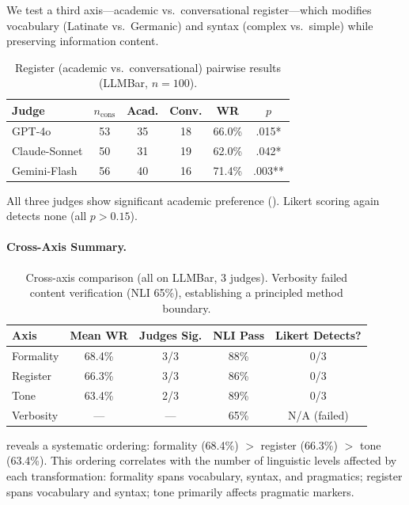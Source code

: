 \documentclass[11pt,a4paper]{article}
\begin{document}
We test a third axis---academic vs.\ conversational register---which modifies vocabulary (Latinate vs.\ Germanic) and syntax (complex vs.\ simple) while preserving information content.

\begin{table}[t]
\centering
\small
\caption{Register (academic vs.\ conversational) pairwise results (LLMBar, $n=100$).}
\label{tab:register}
\begin{tabular}{lccccc}
\toprule
\textbf{Judge} & $n_\text{cons}$ & \textbf{Acad.} & \textbf{Conv.} & \textbf{WR} & $p$ \\
\midrule
GPT-4o        & 53 & 35 & 18 & 66.0\% & .015*  \\
Claude-Sonnet & 50 & 31 & 19 & 62.0\% & .042*  \\
Gemini-Flash  & 56 & 40 & 16 & 71.4\% & .003** \\
\bottomrule
\end{tabular}
\end{table}

All three judges show significant academic preference ().
Likert scoring again detects none (all $p > 0.15$).

\paragraph{Cross-Axis Summary.}

\begin{table}[t]
\centering
\small
\caption{Cross-axis comparison (all on LLMBar, 3 judges). Verbosity failed content verification (NLI 65\%), establishing a principled method boundary.}
\label{tab:crossaxis}
\begin{tabular}{lcccc}
\toprule
\textbf{Axis} & \textbf{Mean WR} & \textbf{Judges Sig.} & \textbf{NLI Pass} & \textbf{Likert Detects?} \\
\midrule
Formality & 68.4\% & 3/3 & 88\% & 0/3 \\
Register  & 66.3\% & 3/3 & 86\% & 0/3 \\
Tone      & 63.4\% & 2/3 & 89\% & 0/3 \\
Verbosity & ---    & --- & 65\% & N/A (failed) \\
\bottomrule
\end{tabular}
\end{table}

 reveals a systematic ordering: formality (68.4\%) $>$ register (66.3\%) $>$ tone (63.4\%).
This ordering correlates with the number of linguistic levels affected by each transformation: formality spans vocabulary, syntax, and pragmatics; register spans vocabulary and syntax; tone primarily affects pragmatic markers.
\end{document}
